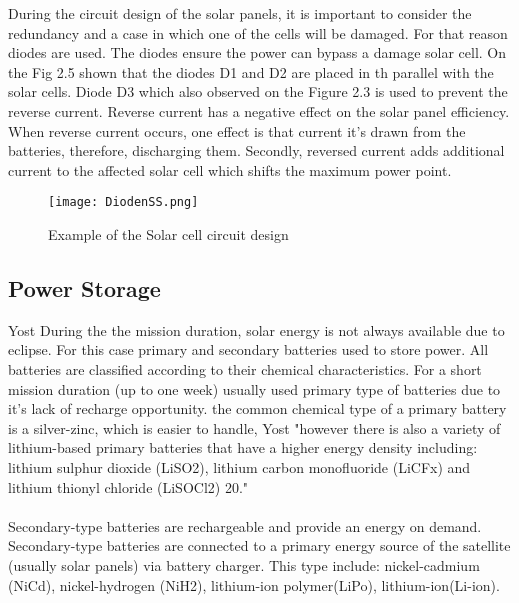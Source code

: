 During the circuit design of the solar panels, it is important to consider the redundancy and a case in which one of the cells will be damaged. For that reason diodes are used. The diodes ensure the power can bypass a damage solar cell. On the Fig 2.5 shown that the diodes D1 and D2 are placed in th parallel with the solar cells. Diode D3 which also observed on the Figure 2.3 is used to prevent the reverse current. Reverse current has a negative effect on the solar panel efficiency. When reverse current occurs, one effect is that current it's drawn from the batteries, therefore, discharging them. Secondly, reversed current adds additional current to the affected solar cell which shifts the maximum power point.\\


\begin{figure}[h]
	\centering
	\texttt{[image: DiodenSS.png]}
	\caption{ Example of the Solar cell circuit design}
	\label{
		: EPS}
\end{figure}
 
\newpage


\subsection{Power Storage \label{sec:tech1}}



Yost\cite{1} During the the mission duration, solar energy is not always available due to eclipse. For this case primary and secondary batteries used to store power. All batteries are classified according to their chemical characteristics. For a short mission duration (up to one week) usually used primary type of batteries due to it's lack of recharge opportunity. the common chemical type of a primary battery is a silver-zinc, which is easier to handle, Yost\cite{1} "however there is also a variety of lithium-based primary batteries that have a higher energy density including: lithium sulphur dioxide (LiSO2), lithium carbon monofluoride (LiCFx) and lithium thionyl chloride (LiSOCl2) 20."\\
\\
Secondary-type batteries are rechargeable and provide an energy on demand. Secondary-type batteries are connected to a primary energy source of the satellite (usually solar panels) via battery charger. This type include: nickel-cadmium (NiCd), nickel-hydrogen (NiH2), lithium-ion polymer(LiPo), lithium-ion(Li-ion).

